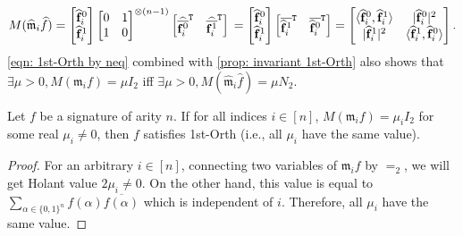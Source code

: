 \begin{equation}\label{eqn: 1st-Orth by neq}
M(\widehat{\mathfrak{m}}_i\widehat{f})=
\left[\begin{matrix}
\widehat{{\bf f}}_i^0\\
\widehat{{\bf f}}_i^1
\end{matrix}\right]
\left[\begin{matrix}
0 & 1 \\
 1 & 0
\end{matrix}\right]^{\otimes (n-1)}
\left[\begin{matrix}
    {\widehat{\overline{{\bf f}_i^{0}}}}^{\tt T} & {\widehat{\overline{{\bf f}_i^{1}}}^{\tt T}}
    \end{matrix}\right]\\
=\left[\begin{matrix}
\widehat{{\bf f}}_i^0\\
\widehat{{\bf f}}_i^1
\end{matrix}\right]
\left[\begin{matrix}
{\overline{\widehat{{\bf f}}_i^{1}}}^{\tt T} &\overline{{\widehat{{\bf f}}_i^{0}}}^{\tt T}
\end{matrix}\right]
=\left[\begin{matrix}
\langle \widehat{{\bf f}}_i^0, \widehat{{\bf f}}_i^1 \rangle & |\widehat{{\bf f}}_i^0|^2\\
|\widehat{{\bf f}}_i^1|^2 & \langle \widehat{{\bf f}}_i^1, \widehat{{\bf f}}_i^0 \rangle
\end{matrix}\right].
\end{equation}
\cref{eqn: 1st-Orth by neq} combined with \cref{prop: invariant 1st-Orth} also shows that $\exists \mu>0,M(\mathfrak m_if)=\mu I_2$ iff $ \exists \mu>0, M(\widehat{\mathfrak m}_i \widehat{f})= \mu N_2$.
\fi

\begin{lemma}\label{lm: 1st-Orth uniform}
    Let $f$ be a signature of arity $n$.
    If for all indices $i\in [n]$, $M(\mathfrak{m}_{i}f)= \mu_i I_2$ for some real $\mu_i\neq 0$, then $f$ satisfies {\sc 1st-Orth} (i.e., all $\mu_i$ have the same value).
\end{lemma}
\begin{proof}
    For an arbitrary $i\in[n]$, connecting two variables of $\mathfrak m_if$ by $=_2$, we will get Holant value $2\mu_i\neq 0.$
    On the other hand, this value is equal to $\sum_{\alpha\in\{0,1\}^n}f(\alpha)\overline{f(\alpha)}$ which is independent of $i$.
    Therefore, all $\mu_i$ have the same value.
\end{proof}

